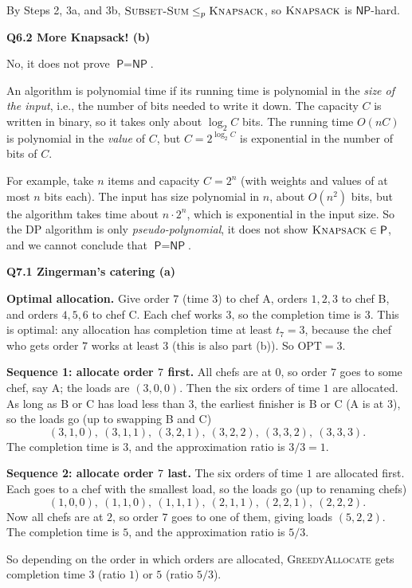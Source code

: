 \documentclass[11pt]{article}
\newcommand{\lp}{\leq_p}
\newcommand{\cproblem}[1]{\textsc{#1}}
\renewcommand{\P}{\textsf{P}}
\newcommand{\NP}{\textsf{NP}}
\newcommand{\SSUM}{\cproblem{Subset-Sum}}
\newcommand{\KNAPSACK}{\cproblem{Knapsack}}
\newcommand{\OPT}{\mathrm{OPT}}
\newcommand{\algo}[1]{\textsc{#1}}
\newcommand{\qpage}[1]{\clearpage\noindent\textbf{\large #1}\par\medskip}
\begin{document}
By Steps 2, 3a, and 3b, $\SSUM \lp \KNAPSACK$, so $\KNAPSACK$ is $\NP$-hard.

\qpage{Q6.2 More Knapsack! (b)}

No, it does not prove $\P = \NP$.

An algorithm is polynomial time if its running time is polynomial in the \emph{size of the input}, i.e., the number of bits needed to write it down.
The capacity $C$ is written in binary, so it takes only about $\log_2 C$ bits.
The running time $O(nC)$ is polynomial in the \emph{value} of $C$, but $C = 2^{\log_2 C}$ is exponential in the number of bits of $C$.

For example, take $n$ items and capacity $C = 2^n$ (with weights and values of at most $n$ bits each).
The input has size polynomial in $n$, about $O(n^2)$ bits, but the algorithm takes time about $n \cdot 2^n$, which is exponential in the input size.
So the DP algorithm is only \emph{pseudo-polynomial}, it does not show $\KNAPSACK \in \P$, and we cannot conclude that $\P = \NP$.

\qpage{Q7.1 Zingerman's catering (a)}

\textbf{Optimal allocation.}
Give order $7$ (time $3$) to chef A, orders $1, 2, 3$ to chef B, and orders $4, 5, 6$ to chef C.
Each chef works $3$, so the completion time is $3$.
This is optimal: any allocation has completion time at least $t_7 = 3$, because the chef who gets order $7$ works at least $3$ (this is also part (b)).
So $\OPT = 3$.

\textbf{Sequence 1: allocate order $7$ first.}
All chefs are at $0$, so order $7$ goes to some chef, say A; the loads are $(3, 0, 0)$.
Then the six orders of time $1$ are allocated.
As long as B or C has load less than $3$, the earliest finisher is B or C (A is at $3$), so the loads go (up to swapping B and C)
\[ (3,1,0),\ (3,1,1),\ (3,2,1),\ (3,2,2),\ (3,3,2),\ (3,3,3). \]
The completion time is $3$, and the approximation ratio is $3/3 = 1$.

\textbf{Sequence 2: allocate order $7$ last.}
The six orders of time $1$ are allocated first.
Each goes to a chef with the smallest load, so the loads go (up to renaming chefs)
\[ (1,0,0),\ (1,1,0),\ (1,1,1),\ (2,1,1),\ (2,2,1),\ (2,2,2). \]
Now all chefs are at $2$, so order $7$ goes to one of them, giving loads $(5, 2, 2)$.
The completion time is $5$, and the approximation ratio is $5/3$.

So depending on the order in which orders are allocated, \algo{GreedyAllocate} gets completion time $3$ (ratio $1$) or $5$ (ratio $5/3$).
\end{document}
